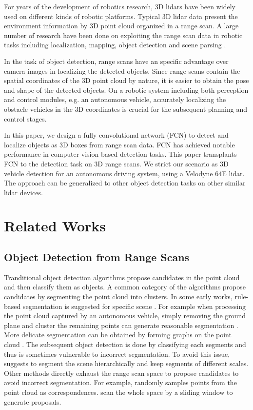 \documentclass[conference]{IEEEtran}
\begin{document}
For years of the development of robotics research, 3D lidars have been widely used on different kinds of robotic platforms.
Typical 3D lidar data present the environment information by 3D point cloud organized in a range scan. A large number of research have been done on exploiting the range scan data in robotic tasks including localization, mapping, object detection and scene parsing \cite{Levinson2010}.

In the task of object detection, range scans have an specific advantage over camera images in localizing the detected objects. Since range scans contain the spatial coordinates of the 3D point cloud by nature, it is easier to obtain the pose and shape of the detected objects. On a robotic system including both perception and control modules, e.g. an autonomous vehicle, accurately localizing the obstacle vehicles in the 3D coordinates is crucial for the subsequent planning and control stages. 

In this paper, we design a fully convolutional network (FCN) to detect and localize objects as 3D boxes from range scan data. FCN has achieved notable performance in computer vision based detection tasks. This paper transplants FCN to the detection task on 3D range scans. We strict our scenario as 3D vehicle detection for an autonomous driving system, using a Velodyne 64E lidar. The approach can be generalized to other object detection tasks on other similar lidar devices.

\section{Related Works}
\subsection{Object Detection from Range Scans}
Tranditional object detection algorithms propose candidates in the point cloud and then classify them as objects. A common category of the algorithms propose candidates by segmenting the point cloud into clusters. In some early works, rule-based segmentation is suggested for specific scene \cite{Himmelsbach2010, Moosmann2009, Douillard2011}. For example when processing the point cloud captured by an autonomous vehicle, simply removing the ground plane and cluster the remaining points can generate reasonable segmentation \cite{Himmelsbach2010, Douillard2011}. More delicate segmentation can be obtained by forming graphs on the point cloud \cite{Wang2012, Klasing2008, Papon2013, Triebel2006, Triebel2005}. The subsequent object detection is done by classifying each segments and thus is sometimes vulnerable to incorrect segmentation. To avoid this issue, \citet{Behley2013a} suggests to segment the scene hierarchically and keep segments of different scales. Other methods directly exhaust the range scan space to propose candidates to avoid incorrect segmentation. For example, \citet{Johnson1999} randomly samples points from the point cloud as correspondences. \citet{Wang} scan the whole space by a sliding window to generate proposals.
\end{document}
